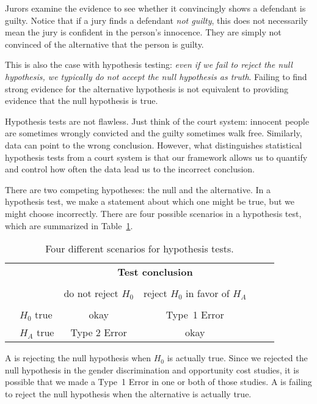 Jurors examine the evidence to see whether it convincingly shows a defendant is guilty. Notice that if a jury finds a defendant \emph{not guilty}, this does not necessarily mean the jury is confident in the person's innocence. They are simply not convinced of the alternative that the person is guilty.

This is also the case with hypothesis testing: \emph{even if we fail to reject the null hypothesis, we typically do not accept the null hypothesis as truth}. Failing to find strong evidence for the alternative hypothesis is not equivalent to providing evidence that the null hypothesis is true.


Hypothesis tests are not flawless. Just think of the court system: innocent people are sometimes wrongly convicted and the guilty sometimes walk free. Similarly, data can point to the wrong conclusion. However, what distinguishes statistical hypothesis tests from a court system is that our framework allows us to quantify and control how often the data lead us to the incorrect conclusion.

There are two competing hypotheses: the null and the alternative. In a hypothesis test, we make a statement about which one might be true, but we might choose incorrectly. There are four possible scenarios in a hypothesis test, which are summarized in Table~\ref{fourHTScenarios}.

\begin{table}[ht]
\centering
\begin{tabular}{l l c c c}
& & \multicolumn{2}{c}{\textbf{Test conclusion}} \\
  \cline{3-4}
\vspace{-3.7mm} \\
& & do not reject $H_0$ &  reject $H_0$ in favor of $H_A$ &
\ \hspace{7mm} \  \\
  \cline{2-4}
\vspace{-3.7mm} \\
& $H_0$ true & okay &  Type~1 Error \\
\raisebox{1.5ex}{\textbf{Truth}} & $H_A$ true & Type 2 Error & okay \\
  \cline{2-4}
\end{tabular}
\caption{Four different scenarios for hypothesis tests.}
\label{fourHTScenarios}
\end{table}

A  is rejecting the null hypothesis when $H_0$ is actually true. Since we rejected the null hypothesis in the gender discrimination and opportunity cost studies, it is possible that we made a Type~1 Error in one or both of those studies. A  is failing to reject the null hypothesis when the alternative is actually true.

